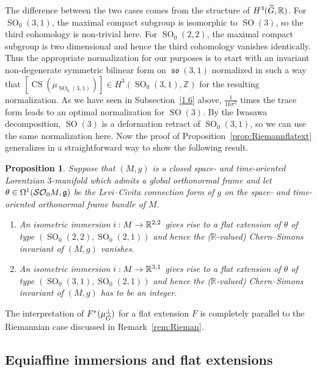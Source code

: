 \documentclass[10pt,a4paper]{amsart}
\newcommand{\Om}{\Omega}
\DeclareMathOperator{\CS}{CS}
\DeclareMathOperator{\SO}{SO}
\DeclareMathOperator{\fkso}{\mathfrak{so}}
\newcommand*{\R}{\mathbb{R}}
\newcommand{\Z}{\mathbb{Z}}
\newcommand{\fkg}{\mathfrak{g}}
\newcommand{\clSO}{\mathcal{SO}}
\renewcommand*{\to}{\mathchoice{\longrightarrow}{\rightarrow}{\rightarrow}{\rightarrow}}
\let\oldtilde\tilde
\renewcommand*{\tilde}[1]{\mathchoice{\widetilde{#1}}{\widetilde{#1}}{\oldtilde{#1}}{\oldtilde{#1}}}
\newtheorem{prop}[theo]{Proposition}
\theoremstyle{definition}\newtheorem{defi}[theo]{Definition}
\begin{document}
The difference between the two cases comes from the structure of $H^3(\tilde G,\R)$. For $\SO_0(3,1)$, the maximal compact subgroup is isomorphic to $\SO(3)$, so the third cohomology is non-trivial here. For $\SO_0(2,2)$, the maximal compact subgroup is two dimensional and hence the third cohomology vanishes identically. Thus the appropriate normalization for our purposes is to start with an invariant non-degenerate symmetric bilinear form on $\fkso(3,1)$ normalized in such a way that $[\CS(\mu_{\SO_0(3,1)})]\in H^3(\SO_0(3,1),\Z)$ for the resulting normalization. As we have seen in Subsection~\ref{1.6} above, $\frac{1}{16\pi^2}$ times the trace form leads to an optimal normalization for $\SO(3)$. By the Iwasawa decomposition, $\SO(3)$ is a deformation retract of $\SO_0(3,1)$, so we can use the same normalization here. Now the proof of Proposition~\ref{prop:Riemannflatext} generalizes in a straightforward way to show the following result.

\begin{prop}\label{prop:Lorentz-flat-ext}
Suppose that $(M,g)$ is a closed space- and time-oriented Lorentzian $3$-ma\-ni\-fold which admits a global orthonormal frame and let $\theta\in\linebreak\Om^1(\clSO _0M,\fkg)$ be the Levi--Civita connection form of $g$ on the space- and time-oriented orthonormal frame bundle of $M$.
\begin{enumerate}
\item\label{prop6.7.1} An isometric immersion $i: M\to \R^{2,2}$ gives rise to a flat extension of $\theta$ of type $(\SO_0(2,2),\SO_0(2,1))$ and hence the ($\R$-valued) Chern--Simons invariant of $(M,g)$ vanishes.

\item\label{prop6.7.2} An isometric immersion $i: M\to \R^{3,1}$ gives rise to a flat extension of $\theta$ of type $(\SO_0(3,1),\SO_0(2,1))$ and hence the ($\R$-valued) Chern--Simons invariant of $(M,g)$ has to be an integer.
\end{enumerate}
\end{prop}

The interpretation of $F^*(\mu_{\tilde G}^\perp)$ for a flat extension $F$ is completely parallel to the Riemannian case discussed in Remark~\ref{rem:Rieman}.

\subsection{Equiaffine immersions and flat extensions}\label{1.8}
\end{document}
